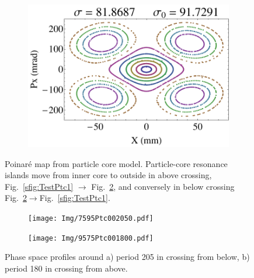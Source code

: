 \begin{figure}
\begin{subfigure}[b]{0.24\textwidth}
        \caption{}\label{sfig:TestPtc3}
    \end{subfigure}
    \begin{subfigure}[b]{0.24\textwidth}
        \includegraphics[width=\textwidth]{Img/TestParticle4.pdf}
        \caption{}\label{sfig:TestPtc4}
    \end{subfigure}
    \caption{Poinar\'{e} map from particle core model. Particle-core resonance islands move from inner core to outside in above crossing, Fig.~\ref{sfig:TestPtc1} $\rightarrow$ Fig.~\ref{sfig:TestPtc4}, and conversely in below crossing Fig.~\ref{sfig:TestPtc4}$\rightarrow$Fig.~\ref{sfig:TestPtc1}.}
    \label{fig:TestPtc}
\end{figure}

\begin{figure}[!hbp]
    \centering
    \begin{subfigure}[b]{0.33\textwidth}
        \texttt{[image: Img/7595Ptc002050.pdf]}
        \caption{}
        \label{sfig:Ptc2tails1}
    \end{subfigure}
    \begin{subfigure}[b]{0.33\textwidth}
        \texttt{[image: Img/9575Ptc001800.pdf]}
        \caption{}
        \label{sfig:Ptc2tails2}
    \end{subfigure}
    \caption{Phase space profiles around a) period 205 in crossing from below, b) period 180 in crossing from above.}
    \label{fig:Ptc2tail}
\end{figure}


